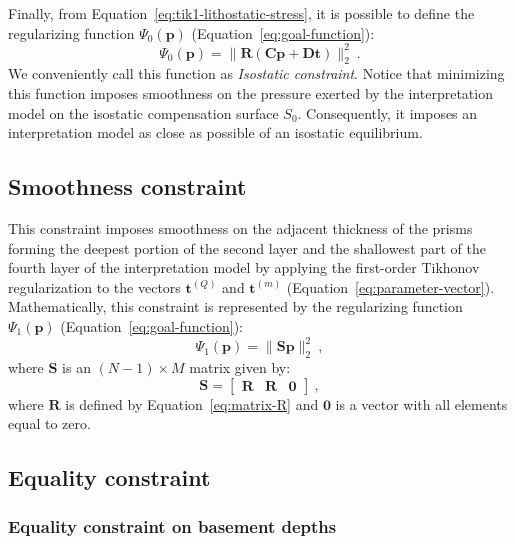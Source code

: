 \documentclass[manuscript]{geophysics}
\begin{document}
Finally, from Equation~\ref{eq:tik1-lithostatic-stress}, it is possible to
define the regularizing function $\Psi_{0}(\mathbf{p})$ 
(Equation~\ref{eq:goal-function}): 
\begin{equation}
\Psi_{0}(\mathbf{p}) = \| \mathbf{R} \left( \mathbf{C} \mathbf{p} + \mathbf{D}
\mathbf{t} \right) \|_{2}^{2} \: .
\label{eq:isostatic-constraint-function}
\end{equation}
We conveniently call this function as \textit{Isostatic constraint}. 
Notice that minimizing this function imposes smoothness on the pressure exerted by the interpretation model on the isostatic compensation surface $S_{0}$. Consequently,
it imposes an interpretation model as close as possible of an isostatic
equilibrium.


\subsection{Smoothness constraint}


This constraint imposes smoothness on the adjacent thickness of the prisms forming the
deepest portion of the second layer and the shallowest part of the fourth layer
of the interpretation model by applying the first-order Tikhonov regularization
\citep{aster-etal2005} to the vectors $\mathbf{t}^{(Q)}$ and $\mathbf{t}^{(m)}$ 
(Equation~\ref{eq:parameter-vector}). 
Mathematically, this constraint is represented by the regularizing function
$\Psi_{1}(\mathbf{p})$ (Equation~\ref{eq:goal-function}):
\begin{equation}
\Psi_{1}(\mathbf{p}) = \| \mathbf{S}\mathbf{p} \|_{2}^{2} \: ,
\label{eq:smootheness-contraint}
\end{equation}
where $\mathbf{S}$ is an $\left( N-1 \right) \times M$ matrix given by:
\begin{equation}
\mathbf{S} = \begin{bmatrix}
\mathbf{R} & \mathbf{R} & \mathbf{0}
\end{bmatrix} \: ,
\label{eq:matrix-S}
\end{equation}
where $\mathbf{R}$ is defined by Equation~\ref{eq:matrix-R} and $\mathbf{0}$
is a vector with all elements equal to zero.


\subsection{Equality constraint}

\subsubsection*{Equality constraint on basement depths}
\end{document}
